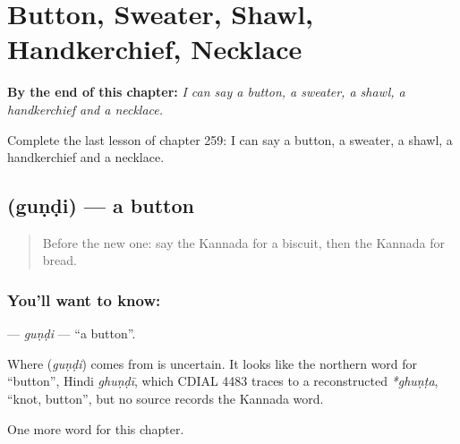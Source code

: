 
\chapter{Button, Sweater, Shawl, Handkerchief, Necklace}
\label{ch:ka-button-sweater-shawl-handkerchief-necklace}

\begin{chapteropening}
\textbf{By the end of this chapter:} \emph{I can say a button, a sweater, a shawl, a handkerchief and a necklace.}

Complete the last lesson of chapter 259: I can say a button, a sweater, a shawl, a handkerchief and a necklace.
\end{chapteropening}

\section[\texorpdfstring{\kn{ಗುಂಡಿ} (guṇḍi)}{ಗುಂಡಿ (guṇḍi)}]{ (guṇḍi) — a button}

\label{lesson:KA-C259-gundi}



\begin{quote}
Before the new one: say the Kannada for a biscuit, then the Kannada for bread.
\end{quote}

\subsection*{You'll want to know: }
\textbf{} — \emph{guṇḍi} — \textquotedblleft{}a button\textquotedblright{}.

\begin{cousinweb}
Where \textbf{} (\emph{guṇḍi}) comes from is uncertain. It looks like the northern word for \textquotedblleft{}button\textquotedblright{}, Hindi \emph{ghuṇḍī}, which CDIAL 4483 traces to a reconstructed \emph{*ghuṇṭa}, \textquotedblleft{}knot, button\textquotedblright{}, but no source records the Kannada word.
\end{cousinweb}

\begin{grammarlens}[title={What you've built}]
One more word for this chapter.
\end{grammarlens}

